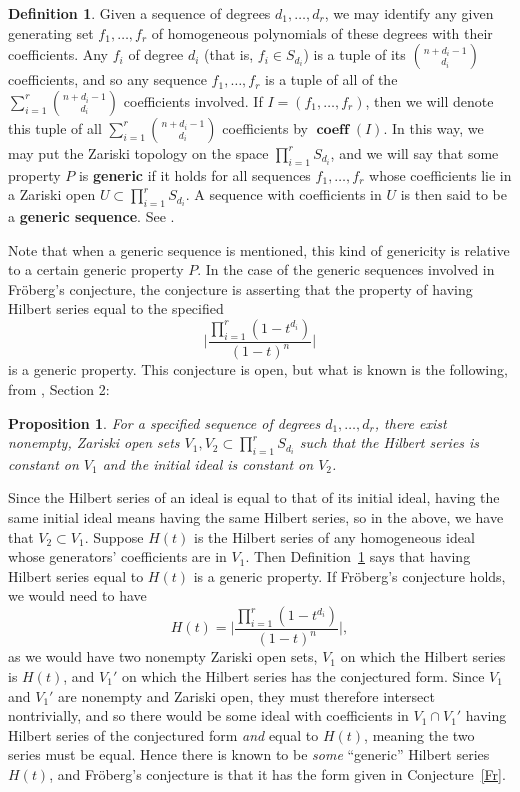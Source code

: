 \documentclass[11pt]{article}
\DeclareMathOperator{\coeff}{\textbf{coeff}}
\newtheorem{proposition}{Proposition}
\theoremstyle{definition}
\newtheorem{definition}{Definition}
\begin{document}
\begin{definition}\label{def:genD}
	Given a sequence of degrees $d_1, \dots, d_r$, we may identify any given generating set $f_1, \dots, f_r$ of homogeneous polynomials of these degrees with their coefficients. Any $f_i$ of degree $d_i$ (that is, $f_i \in S_{d_i}$) is a tuple of its $\binom{n + d_i - 1}{d_i}$ coefficients, and so any sequence $f_1, \dots, f_r$ is a tuple of all of the $\sum_{i = 1}^r \binom{n + d_i - 1}{d_i}$ coefficients involved. If $I = (f_1, \dots, f_r)$, then we will denote this tuple of all $\sum_{i = 1}^r \binom{n + d_i - 1}{d_i}$ coefficients by $\coeff(I)$. In this way, we may put the Zariski topology on the space $\prod_{i = 1}^r S_{d_i}$, and we will say that some property $P$ is \textbf{generic} if it holds for all sequences $f_1, \dots, f_r$ whose coefficients lie in a Zariski open $U \subset \prod_{i = 1}^r S_{d_i}$. A sequence with coefficients in $U$ is then said to be a \textbf{generic sequence}. See \cite{pardue2010generic}.
\end{definition}


Note that when a generic sequence is mentioned, this kind of genericity is relative to a certain generic property $P$. In the case of the generic sequences involved in Fröberg's conjecture, the conjecture is asserting that the property of having Hilbert series equal to the specified \[ \bigg| \frac{\prod_{i=1}^r (1 - t^{d_i})}{(1 - t)^n} \bigg| \] is a generic property. This conjecture is open, but what is known is the following, from \cite{pardue2010generic}, Section 2:


\begin{proposition}\label{prop:V1V2}
	For a specified sequence of degrees $d_1, \dots, d_r$, there exist nonempty, Zariski open sets $V_1, V_2 \subset \prod_{i = 1}^r S_{d_i}$ such that the Hilbert series is constant on $V_1$ and the initial ideal is constant on $V_2$. 
\end{proposition}


Since the Hilbert series of an ideal is equal to that of its initial ideal, having the same initial ideal means having the same Hilbert series, so in the above, we have that $V_2 \subset V_1$. Suppose $H(t)$ is the Hilbert series of any homogeneous ideal whose generators' coefficients are in $V_1$. Then Definition~\ref{def:genD} says that having Hilbert series equal to $H(t)$ is a generic property. If Fröberg's conjecture holds, we would need to have \[ H(t) = \bigg| \frac{\prod_{i=1}^r (1 - t^{d_i})}{(1 - t)^n} \bigg|, \] as we would have two nonempty Zariski open sets, $V_1$ on which the Hilbert series is $H(t)$, and $V_1'$ on which the Hilbert series has the conjectured form. Since $V_1$ and $V_1'$ are nonempty and Zariski open, they must therefore intersect nontrivially, and so there would be some ideal with coefficients in $V_1 \cap V_1'$ having Hilbert series of the conjectured form \emph{and} equal to $H(t)$, meaning the two series must be equal. Hence there is known to be \emph{some} ``generic'' Hilbert series $H(t)$, and Fröberg's conjecture is that it has the form given in Conjecture~\ref{Fr}. 
\end{document}
